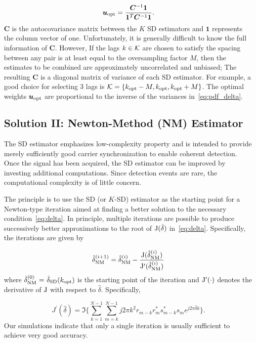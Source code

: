 \begin{equation}
  \label{eq:u_opt}
      \bm{u}_{\text{opt}}=\frac{\bm{C}^{-1}\bm{1}}{\bm{1}^T\bm{C}^{-1}\bm{1}}.
\end{equation}
$\bm{C}$ is the autocovariance matrix between the $K$ SD estimators and $\bm{1}$ represents the column vector of one. 
Unfortunately, it is generally difficult to know the full information of $\bm{C}$. However,
If the lags $k \in {\cal K}$ are chosen to satisfy the spacing between any pair is at least
equal to the oversampling factor $M$, then the estimates to be combined are approximately uncorrelated and unbiased; The  
resulting $\bm{C}$ is a diagonal matrix of variance of each SD estimator. For example, a good choice for selecting 3 lags is 
${\cal K}=\{k_{\text{opt}}-M,k_{\text{opt}},k_{\text{opt}}+M\}$. The optimal weights $\bm{u}_{\text{opt}}$ are proportional to the inverse of the
variances in~\eqref{eq:pdf_delta}.

\subsection{Solution II: Newton-Method (NM) Estimator}

The SD estimator emphasizes low-complexity property and is intended to provide merely sufficiently good carrier synchronization
to enable coherent detection. Once the signal has been acquired, the SD estimator can be improved by 
investing additional computations. Since detection events are rare, the computational complexity is of little concern.

The principle is to use the SD (or $K$-SD) estimator as the starting point for a Newton-type iteration 
aimed at finding a better solution to the necessary condition~\eqref{eq:delta}. 
In principle, multiple iterations are possible to produce successively better approximations to the root of
$\mathrm{J}(\hat{\delta})$ in~\eqref{eq:delta}. Specifically, the iterations are given by

\begin{equation}
    \label{eq:iter_NM_est}
    \hat{\delta}_{\text{NM}}^{(i+1)}=\hat{\delta}_{\text{NM}}^{(i)}-
    \frac{\mathrm{J}(\hat{\delta}_{\text{NM}}^{(i)})}{\mathrm{J}^\prime(\hat{\delta}_{\text{NM}}^{(i)})}
  \end{equation}
where $\hat{\delta}_{\text{NM}}^{(0)}~{=}~\hat{\delta}_{\text{SD}}(k_{\text{opt}})$ is the starting point of the iteration and
$\mathrm{J}^\prime(\cdot)$ denotes the derivative of $\mathrm{J}$ with respect to $\hat{\delta}$. Specifically,

\begin{equation}
    \label{eq:derivative of delta}
    J^\prime(\hat{\delta}) = \Im\bigg\{\sum_{k=1}^{N-1}{\sum_{m=k}^{N-1}{j2\pi k^2r_{m-k}r_m^{*}s_{m-k}^{*}s_m}e^{j2\pi\hat{\delta}k}}\bigg\}.
    \end{equation}
Our simulations indicate that only a single iteration is usually sufficient to achieve very good accuracy.


